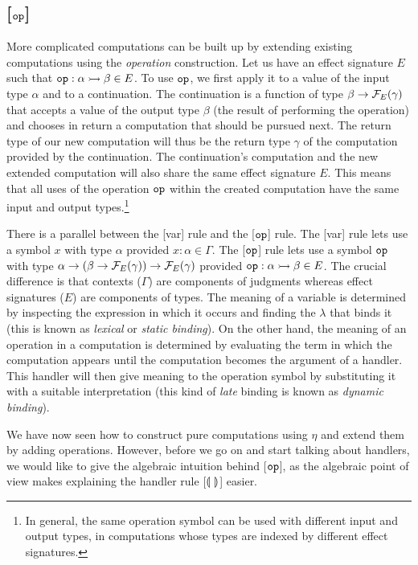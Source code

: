 \subsection*{[$\mathtt{op}$]}

More complicated computations can be built up by extending existing
computations using the \emph{operation} construction. Let us have an effect
signature $E$ such that $\mathtt{op} : \alpha \rightarrowtail \beta \in E$. To use
$\mathtt{op}$, we first apply it to a value of the input type $\alpha$ and to a
continuation. The continuation is a function of type
$\beta \to \mathcal{F}_E(\gamma)$ that accepts a value of the output type $\beta$
(the result of performing the operation) and chooses in return a
computation that should be pursued next. The return type of our new
computation will thus be the return type $\gamma$ of the computation
provided by the continuation. The continuation's computation and the new
extended computation will also share the same effect signature $E$. This
means that all uses of the operation $\mathtt{op}$ within the created
computation have the same input and output types.\footnote{In general, the
  same operation symbol can be used with different input and output types,
  in computations whose types are indexed by different effect signatures.}

There is a parallel between the [var] rule and the [$\mathtt{op}$] rule. The
[var] rule lets use a symbol $x$ with type $\alpha$ provided
$x : \alpha \in \Gamma$. The [$\mathtt{op}$] rule lets use a symbol $\mathtt{op}$
with type $\alpha \to (\beta \to \mathcal{F}_E(\gamma)) \to \mathcal{F}_E(\gamma)$ provided
$\mathtt{op} : \alpha \rightarrowtail \beta \in E$. The crucial difference is that
contexts ($\Gamma$) are components of judgments whereas effect signatures
($E$) are components of types. The meaning of a variable is determined by
inspecting the expression in which it occurs and finding the $\lambda$ that
binds it (this is known as \emph{lexical} or \emph{static binding}). On the
other hand, the meaning of an operation in a computation is determined by
evaluating the term in which the computation appears until the computation
becomes the argument of a handler. This handler will then give meaning to
the operation symbol by substituting it with a suitable interpretation
(this kind of \emph{late} binding is known as \emph{dynamic binding}).

We have now seen how to construct pure computations using $\eta$ and extend
them by adding operations. However, before we go on and start talking about
handlers, we would like to give the algebraic intuition behind [$\mathtt{op}$],
as the algebraic point of view makes explaining the handler rule
[$\llparenthesis \,  \, \rrparenthesis$] easier.

